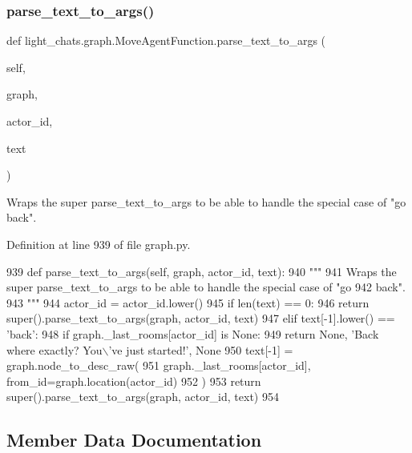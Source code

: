 \subsubsection{\texorpdfstring{parse\+\_\+text\+\_\+to\+\_\+args()}{parse\_text\_to\_args()}}
{\footnotesize\ttfamily def light\+\_\+chats.\+graph.\+Move\+Agent\+Function.\+parse\+\_\+text\+\_\+to\+\_\+args (\begin{DoxyParamCaption}\item[{}]{self,  }\item[{}]{graph,  }\item[{}]{actor\+\_\+id,  }\item[{}]{text }\end{DoxyParamCaption})}

\begin{DoxyVerb}Wraps the super parse_text_to_args to be able to handle the special case of "go
back".
\end{DoxyVerb}
 

Definition at line 939 of file graph.\+py.


\begin{DoxyCode}
939     \textcolor{keyword}{def }parse\_text\_to\_args(self, graph, actor\_id, text):
940         \textcolor{stringliteral}{"""}
941 \textcolor{stringliteral}{        Wraps the super parse\_text\_to\_args to be able to handle the special case of "go}
942 \textcolor{stringliteral}{        back".}
943 \textcolor{stringliteral}{        """}
944         actor\_id = actor\_id.lower()
945         \textcolor{keywordflow}{if} len(text) == 0:
946             \textcolor{keywordflow}{return} super().parse\_text\_to\_args(graph, actor\_id, text)
947         \textcolor{keywordflow}{elif} text[-1].lower() == \textcolor{stringliteral}{'back'}:
948             \textcolor{keywordflow}{if} graph.\_last\_rooms[actor\_id] \textcolor{keywordflow}{is} \textcolor{keywordtype}{None}:
949                 \textcolor{keywordflow}{return} \textcolor{keywordtype}{None}, \textcolor{stringliteral}{'Back where exactly? You\(\backslash\)'ve just started!'}, \textcolor{keywordtype}{None}
950             text[-1] = graph.node\_to\_desc\_raw(
951                 graph.\_last\_rooms[actor\_id], from\_id=graph.location(actor\_id)
952             )
953         \textcolor{keywordflow}{return} super().parse\_text\_to\_args(graph, actor\_id, text)
954 
\end{DoxyCode}


\subsection{Member Data Documentation}
\mbox{\label{classlight__chats_1_1graph_1_1MoveAgentFunction_af70bc014668a0da4126b2edb64f71d98}} 
